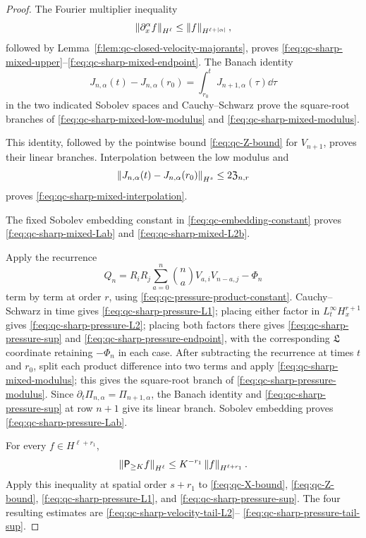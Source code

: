 {\begin{proof}
The Fourier multiplier inequality
\[
 \left\lVert \partial_x^\alpha f\right\rVert_{H^\ell}
 \le\left\lVert f\right\rVert_{H^{\ell+|\alpha|}},
\]
followed by Lemma~\ref{f:lem:qc-closed-velocity-majorants}, proves
\eqref{f:eq:qc-sharp-mixed-upper}--\eqref{f:eq:qc-sharp-mixed-endpoint}.
The Banach identity
\[
 J_{n,\alpha}(t)-J_{n,\alpha}(r_0)
 =\int_{r_0}^tJ_{n+1,\alpha}(\tau)\dd\tau
\]
in the two indicated Sobolev spaces and Cauchy--Schwarz prove the
square-root branches of \eqref{f:eq:qc-sharp-mixed-low-modulus} and
\eqref{f:eq:qc-sharp-mixed-modulus}.
\begin{samepage}
This identity, followed by the
pointwise bound \eqref{f:eq:qc-Z-bound} for \(V_{n+1}\), proves their linear
branches.  Interpolation between the low modulus
and
\[
 \left\lVert J_{n,\alpha}(t)-J_{n,\alpha}(r_0)\right\rVert_{H^s}
 \le2\mathfrak Z_{n,r}
\]
proves \eqref{f:eq:qc-sharp-mixed-interpolation}.
\end{samepage}
The fixed Sobolev embedding constant in \eqref{f:eq:qc-embedding-constant} proves
\eqref{f:eq:qc-sharp-mixed-Lab} and \eqref{f:eq:qc-sharp-mixed-L2b}.

Apply the recurrence
\[
 Q_n=R_iR_j\sum_{a=0}^{n}\binom naV_{a,i}V_{n-a,j}
 -\Phi_n
\]
term by term at order \(r\), using
\eqref{f:eq:qc-pressure-product-constant}.  Cauchy--Schwarz in time gives
\eqref{f:eq:qc-sharp-pressure-L1}; placing either factor in
\(L_t^\infty H_x^{r+1}\) gives
\eqref{f:eq:qc-sharp-pressure-L2}; placing both factors there gives
\eqref{f:eq:qc-sharp-pressure-sup} and
\eqref{f:eq:qc-sharp-pressure-endpoint}, with the corresponding
\(\mathfrak L\) coordinate retaining \(-\Phi_n\) in each case.  After subtracting the recurrence at
times \(t\) and \(r_0\), split each product difference into two terms and
apply \eqref{f:eq:qc-sharp-mixed-modulus}; this gives the square-root branch
of \eqref{f:eq:qc-sharp-pressure-modulus}.  Since
\(\partial_t\Pi_{n,\alpha}=\Pi_{n+1,\alpha}\), the Banach identity and
\eqref{f:eq:qc-sharp-pressure-sup} at row \(n+1\) give its linear branch.
Sobolev embedding proves
\eqref{f:eq:qc-sharp-pressure-Lab}.

For every \(f\in H^{\ell+r_1}\),
\[
 \left\lVert \mathsf P_{\ge K}f\right\rVert_{H^\ell}
 \le K^{-r_1}\left\lVert f\right\rVert_{H^{\ell+r_1}}.
\]
Apply this inequality at spatial order \(s+r_1\) to
\eqref{f:eq:qc-X-bound}, \eqref{f:eq:qc-Z-bound},
\eqref{f:eq:qc-sharp-pressure-L1}, and
\eqref{f:eq:qc-sharp-pressure-sup}.  The four resulting estimates are
\eqref{f:eq:qc-sharp-velocity-tail-L2}--%
\eqref{f:eq:qc-sharp-pressure-tail-sup}.


\end{proof}}
